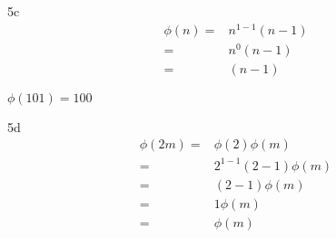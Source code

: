 \begin{question}{5c}
\begin{align*}
\phi(n) =& n^{1-1}(n-1)\\
=& n^{0}(n-1)\\
=& (n-1)
\end{align*}

$\phi(101)=100$
\end{question}

\begin{question}{5d}
\begin{align*}
\phi(2m) =& \phi(2) \phi(m)\\
=& 2^{1-1}(2-1) \phi(m)\\
=& (2-1) \phi(m)\\
=& 1\phi(m)\\
=& \phi(m)\\
\end{align*}
\end{question}






